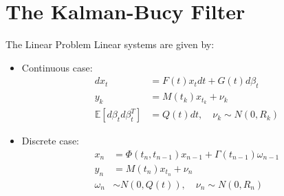 \documentclass{beamer}
\begin{document}
\section{The Kalman-Bucy Filter}

\begin{frame}{The Linear Problem}
  Linear systems are given by:

  \begin{itemize}
   \pause
  \item Continuous case: \\
    \begin{align}
      dx_t &= F(t) x_t dt + G(t) d\beta_t \\
      y_k &= M(t_k) x_{t_k} + \nu_k \\
      \mathbb{E}[d\beta_td\beta_t^T] &= Q(t) dt, \quad \nu_k \sim N(0,R_k)
    \end{align}
   \pause
  \item Discrete case: \\
    \begin{align}
      x_n &= \Phi(t_n,t_{n-1})x_{n-1} + \Gamma(t_{n-1})\omega_{n-1}  \\
      y_n &= M(t_n) x_{t_n} + \nu_n \\
      \omega_{n} &\sim N(0,Q(t)), \quad \nu_n \sim N(0,R_n)
    \end{align}
  \end{itemize}
\end{frame}
\end{document}
